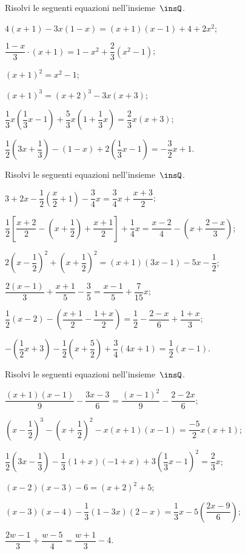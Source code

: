 \begin{esercizio}[\Ast]
\label{ese:15.34}
Risolvi le seguenti equazioni nell'insieme~$\insQ$.
\begin{enumeratea}
 \item $4(x+1)-3x(1-x)=(x+1)(x-1)+4+2x^{2}$;
 \item $\dfrac{1-x}{3}\cdot (x+1)=1-x^{2}+\dfrac{2}{3}\left(x^{2}-1\right)$;
 \item $(x+1)^{2}=x^{2}-1$;
 \item $(x+1)^{3}=(x+2)^{3}-3x(x+3)$;
 \item $\dfrac{1}{3}x\left(\dfrac{1}{3}x-1\right)+\dfrac{5}{3}x\left(1+\dfrac{1}{3}x\right)=\dfrac{2}{3}x(x+3)$;
 \item $\dfrac{1}{2}\left(3x+\dfrac{1}{3}\right)-(1-x)+2\left(\dfrac{1}{3}x-1\right)=-{\dfrac{3}{2}}x+1$.
\end{enumeratea}
\end{esercizio}

\begin{esercizio}[\Ast]
\label{ese:15.35}
Risolvi le seguenti equazioni nell'insieme~$\insQ$.
\begin{enumeratea}
 \item $3+2x-\dfrac{1}{2}\left(\dfrac{x}{2}+1\right)-\dfrac{3}{4}x=\dfrac{3}{4}x+\dfrac{x+3}{2}$;
 \item $\dfrac{1}{2}\left[\dfrac{x+2}{2}-\left(x+\dfrac{1}{2}\right)+\dfrac{x+1}{2}\right]+\dfrac{1}{4}x=\dfrac{x-2}{4}-\left(x+\dfrac{2-x}{3}\right)$;
 \item $2\left(x-\dfrac{1}{2}\right)^{2}+\left(x+\dfrac{1}{2}\right)^{2}=(x+1)(3x-1)-5x-\dfrac{1}{2}$;
 \item $\dfrac{2\left(x-1\right)}{3}+\dfrac{x+1}{5}-\dfrac{3}{5}=\dfrac{x-1}{5}+\dfrac{7}{15}x$;
 \item $\dfrac{1}{2}(x-2)-\left(\dfrac{x+1}{2}-\dfrac{1+x}{2}\right)=\dfrac{1}{2}-\dfrac{2-x}{6}+\dfrac{1+x}{3}$;
 \item $-\left(\dfrac{1}{2}x+3\right)-\dfrac{1}{2}\left(x+\dfrac{5}{2}\right)+\dfrac{3}{4}(4x+1)=\dfrac{1}{2}(x-1)$.
\end{enumeratea}
\end{esercizio}

\begin{esercizio}[\Ast]
\label{ese:15.36}
Risolvi le seguenti equazioni nell'insieme~$\insQ$.
\begin{enumeratea}
 \item $\dfrac{(x+1)(x-1)}{9}-\dfrac{3x-3}{6}=\dfrac{(x-1)^{2}}{9}-\dfrac{2-2x}{6}$;
 \item $\left(x-\dfrac{1}{2}\right)^{3}-\left(x+\dfrac{1}{2}\right)^{2}-x(x+1)(x-1)=\dfrac{-5}{2}x(x+1)$;
 \item $\dfrac{1}{2}\left(3x-\dfrac{1}{3}\right)-\dfrac{1}{3}(1+x)(-1+x)+3\left(\dfrac{1}{3}x-1\right)^{2}=\dfrac{2}{3}x$;
 \item $(x-2)(x-3)-6=(x+2)^2 +5$;
 \item $(x-3)(x-4)-\dfrac{1}{3}(1-3x)(2-x)=\dfrac{1}{3}x-5\left(\dfrac{2x-9}{6}\right)$;
 \item $\dfrac{2w-1}{3}+\dfrac{w-5}{4}=\dfrac{w+1}{3}-4$.
\end{enumeratea}
\end{esercizio}

